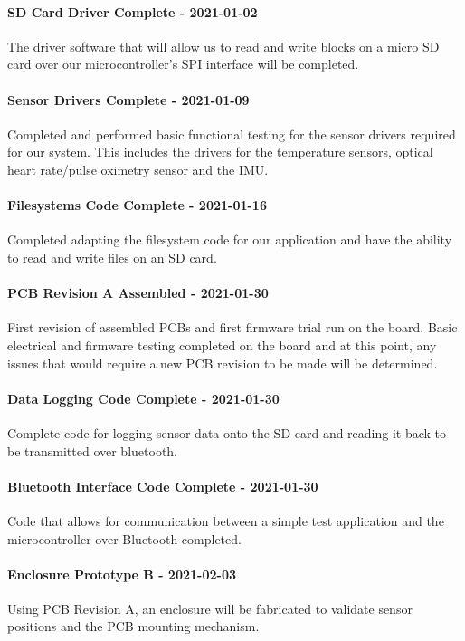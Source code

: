 \paragraph{SD Card Driver Complete - 2021-01-02}
The driver software that will allow us to
read and write blocks on a micro SD card over our microcontroller's SPI
interface will be completed.

\paragraph{Sensor Drivers Complete - 2021-01-09}
Completed and performed basic functional testing for the
sensor drivers required for our system.  This includes the drivers for the
temperature sensors, optical heart rate/pulse oximetry sensor and the IMU.

\paragraph{Filesystems Code Complete - 2021-01-16}
Completed adapting the filesystem code for our
application and have the ability to read and write files on an SD card.

\paragraph{PCB Revision A Assembled - 2021-01-30}
First revision of assembled PCBs and first firmware trial run on the board.
Basic electrical and firmware testing completed on the board and at this 
point, any issues that would require a new PCB revision to be made will be
determined.

\paragraph{Data Logging Code Complete - 2021-01-30}
Complete code for logging sensor data onto the SD
card and reading it back to be transmitted over bluetooth.

\paragraph{Bluetooth Interface Code Complete - 2021-01-30}
Code that allows for communication between a simple test
application and the microcontroller over Bluetooth completed.

\paragraph{Enclosure Prototype B - 2021-02-03}
Using PCB Revision A, an enclosure will be fabricated to validate sensor
positions and the PCB mounting mechanism.

